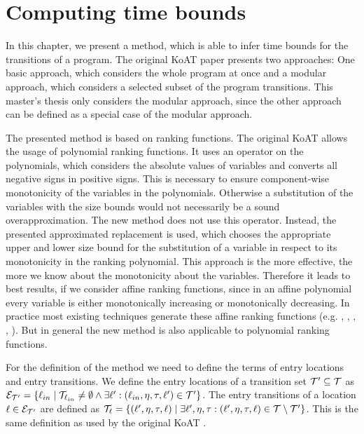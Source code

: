 \section{Computing time bounds}

In this chapter, we present a method, which is able to infer time bounds for the transitions of a program.
The original KoAT paper \cite{koat} presents two approaches: One basic approach, which considers the whole program at once and a modular approach, which considers a selected subset of the program transitions.
This master's thesis only considers the modular approach, since the other approach can be defined as a special case of the modular approach.

The presented method is based on ranking functions.
The original KoAT allows the usage of polynomial ranking functions.
It uses an operator on the polynomials, which considers the absolute values of variables and converts all negative signs in positive signs.
This is necessary to ensure component-wise monotonicity of the variables in the polynomials.
Otherwise a substitution of the variables with the size bounds would not necessarily be a sound overapproximation.
The new method does not use this operator.
Instead, the presented approximated replacement is used, which chooses the appropriate upper and lower size bound for the substitution of a variable in respect to its monotonicity in the ranking polynomial.
This approach is the more effective, the more we know about the monotonicity about the variables.
Therefore it leads to best results, if we consider affine ranking functions, since in an affine polynomial every variable is either monotonically increasing or monotonically decreasing.
In practice most existing techniques generate these affine ranking functions (e.g. \cite{podelski2004prf}, \cite{bradley2005linear}, \cite{bagnara2012new}, \cite{leike2014ranking}, \cite{ben2013linear}).
But in general the new method is also applicable to polynomial ranking functions.

For the definition of the method we need to define the terms of entry locations and entry transitions.
We define the entry locations of a transition set $\mathcal{T}' \subseteq \mathcal{T}$ as $\mathcal{E}_{\mathcal{T}'} = \lbrace \ell_{in} \mid \mathcal{T}_{\ell_{in}} \neq \emptyset \wedge \exists \ell': (\ell_{in}, \eta, \tau, \ell') \in \mathcal{T}' \rbrace$.
The entry transitions of a location $\ell \in \mathcal{E}_{\mathcal{T}'}$ are defined as $\mathcal{T}_{\ell} = \lbrace (\ell', \eta, \tau, \ell) \mid \exists \ell', \eta, \tau: (\ell', \eta, \tau, \ell) \in \mathcal{T} \setminus \mathcal{T}' \rbrace$.
This is the same definition as used by the original KoAT \cite{koat}.

